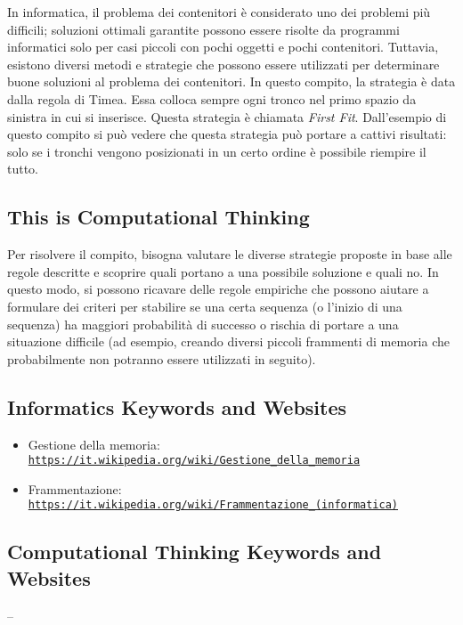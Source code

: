 \documentclass[a4paper,11pt]{report}
\newcommand{\BrochureUrlText}[1]{\texttt{#1}}
\begin{document}
In informatica, il problema dei contenitori è considerato uno dei problemi più difficili; soluzioni ottimali garantite possono essere risolte da programmi informatici solo per casi piccoli con pochi oggetti e pochi contenitori. Tuttavia, esistono diversi metodi e strategie che possono essere utilizzati per determinare buone soluzioni al problema dei contenitori. In questo compito, la strategia è data dalla regola di Timea. Essa colloca sempre ogni tronco nel primo spazio da sinistra in cui si inserisce. Questa strategia è chiamata \emph{First Fit}. Dall’esempio di questo compito si può vedere che questa strategia può portare a cattivi risultati: solo se i tronchi vengono posizionati in un certo ordine è possibile riempire il tutto.


\subsection*{This is Computational Thinking}

Per risolvere il compito, bisogna valutare le diverse strategie proposte in base alle regole descritte e scoprire quali portano a una possibile soluzione e quali no. In questo modo, si possono ricavare delle regole empiriche che possono aiutare a formulare dei criteri per stabilire se una certa sequenza (o l’inizio di una sequenza) ha maggiori probabilità di successo o rischia di portare a una situazione difficile (ad esempio, creando diversi piccoli frammenti di memoria che probabilmente non potranno essere utilizzati in seguito).


\subsection*{Informatics Keywords and Websites}

\begin{itemize}
  \item Gestione della memoria: \href{https://it.wikipedia.org/wiki/Gestione_della_memoria}{\BrochureUrlText{https://it.wikipedia.org/wiki/Gestione\_della\_memoria}}
  \item Frammentazione: \href{https://it.wikipedia.org/wiki/Frammentazione_(informatica)}{\BrochureUrlText{https://it.wikipedia.org/wiki/Frammentazione\_(informatica)}}
\end{itemize}


\subsection*{Computational Thinking Keywords and Websites}

–
\end{document}
